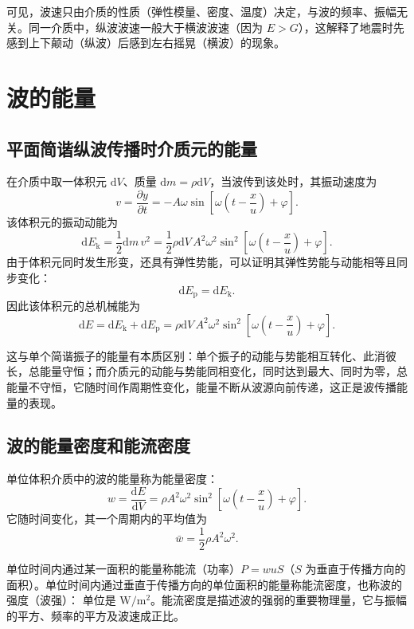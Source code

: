     可见，波速只由介质的性质（弹性模量、密度、温度）决定，与波的频率、振幅无关。同一介质中，纵波波速一般大于横波波速（因为 $E>G$），这解释了地震时先感到上下颠动（纵波）后感到左右摇晃（横波）的现象。


\section{波的能量}
    \subsection{平面简谐纵波传播时介质元的能量}
    在介质中取一体积元 $\mathrm{d}V$、质量 $\mathrm{d}m=\rho\mathrm{d}V$，当波传到该处时，其振动速度为
    \[
    v=\frac{\partial y}{\partial t}=-A\omega\sin\left[\omega\left(t-\frac{x}{u}\right)+\varphi\right].
    \]
    该体积元的振动动能为
    \[
    \mathrm{d}E_\mathrm{k}=\frac{1}{2}\mathrm{d}m\,v^{2}
    =\frac{1}{2}\rho\mathrm{d}V\,A^{2}\omega^{2}\sin^{2}\left[\omega\left(t-\frac{x}{u}\right)+\varphi\right].
    \]
    由于体积元同时发生形变，还具有弹性势能，可以证明其弹性势能与动能相等且同步变化：
    \[
    \mathrm{d}E_\mathrm{p}=\mathrm{d}E_\mathrm{k}.
    \]
    因此该体积元的总机械能为
    \[
    \mathrm{d}E=\mathrm{d}E_\mathrm{k}+\mathrm{d}E_\mathrm{p}
    =\rho\mathrm{d}V\,A^{2}\omega^{2}\sin^{2}\left[\omega\left(t-\frac{x}{u}\right)+\varphi\right].
    \]

    这与单个简谐振子的能量有本质区别：单个振子的动能与势能相互转化、此消彼长，总能量守恒；而介质元的动能与势能同相变化，同时达到最大、同时为零，总能量不守恒，它随时间作周期性变化，能量不断从波源向前传递，这正是波传播能量的表现。

    \subsection{波的能量密度和能流密度}
    单位体积介质中的波的能量称为能量密度：
    \[
    w=\frac{\mathrm{d}E}{\mathrm{d}V}=\rho A^{2}\omega^{2}\sin^{2}\left[\omega\left(t-\frac{x}{u}\right)+\varphi\right].
    \]
    它随时间变化，其一个周期内的平均值为
    \[
    \bar{w}=\frac{1}{2}\rho A^{2}\omega^{2}.
    \]

    单位时间内通过某一面积的能量称能流（功率）$P=wuS$（$S$ 为垂直于传播方向的面积）。单位时间内通过垂直于传播方向的单位面积的能量称能流密度，也称波的强度（波强）：
    单位是 $\mathrm{W/m^{2}}$。能流密度是描述波的强弱的重要物理量，它与振幅的平方、频率的平方及波速成正比。

